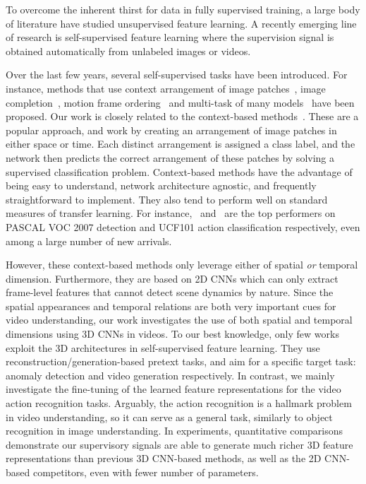 \documentclass[letterpaper]{article} \usepackage{aaai19}  \usepackage{times}  \usepackage{helvet}  \usepackage{courier}  \usepackage{url}  \usepackage{graphicx}  \frenchspacing  \setlength{\pdfpagewidth}{8.5in}  \setlength{\pdfpageheight}{11in}
\begin{document}
To overcome the inherent thirst for data in fully supervised training, a large body of literature have studied unsupervised feature learning. A recently emerging line of research is self-supervised feature learning where the supervision signal is obtained automatically from unlabeled images or videos.


Over the last few years, several self-supervised tasks  have been introduced.
For instance, methods that use context arrangement of image patches~\cite{doersch2015unsupervised,noroozi2016unsupervised}, image completion~\cite{Pathak2016inpainting}, motion frame ordering~\cite{misra2016shuffle,lee2017unsupervised} and multi-task of many models~\cite{Kim2018Jigsaw} have been proposed. Our work is closely related to the context-based methods~\cite{doersch2015unsupervised,noroozi2016unsupervised,misra2016shuffle,lee2017unsupervised,Kim2018Jigsaw}. These are a popular approach, and work by creating an arrangement of image patches in either space or time. Each distinct arrangement is assigned a class label, and the network then predicts the correct arrangement of these patches by solving a supervised classification problem. Context-based methods have the advantage of being easy to understand, network architecture agnostic, and frequently straightforward to implement. They also tend to perform well on standard measures of transfer learning. For instance,~\cite{noroozi2016unsupervised} and~\cite{lee2017unsupervised} are the top performers on PASCAL VOC 2007 detection and UCF101 action classification respectively, even among a large number of new arrivals. 

However, these context-based methods only leverage either of spatial \textit{or} temporal dimension. Furthermore, they are based on 2D CNNs which can only extract frame-level features that cannot detect scene dynamics by nature. Since the spatial appearances and temporal relations are both very important cues for video understanding, our work investigates the use of both spatial and temporal dimensions using 3D CNNs in videos. 
To our best knowledge, only few works~\cite{zhao2017spatio,vondrick2016generating} exploit the 3D architectures in self-supervised feature learning. They use reconstruction/generation-based pretext tasks, and aim for a specific target task: anomaly detection and video generation respectively. In contrast, we mainly investigate the fine-tuning of the learned feature representations for the video action recognition tasks. Arguably, the action
recognition is a hallmark problem in video understanding, so it can serve as a general task, similarly to object recognition in image understanding. 
In experiments, quantitative comparisons demonstrate our supervisory signals are able to generate much richer 3D feature representations than previous 3D CNN-based methods, as well as the 2D CNN-based competitors, even with fewer number of parameters.
\end{document}
